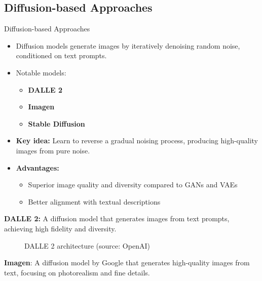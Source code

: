 \subsection{Diffusion-based Approaches}
\begin{frame}[allowframebreaks]{Diffusion-based Approaches}
    \begin{itemize}
        \item Diffusion models generate images by iteratively denoising random noise, conditioned on text prompts.
        \item Notable models:
        \begin{itemize}
            \item \textbf{DALL\textbullet E 2}
            \item \textbf{Imagen}
            \item \textbf{Stable Diffusion}
        \end{itemize}
        \item \textbf{Key idea:} Learn to reverse a gradual noising process, producing high-quality images from pure noise.
        \item \textbf{Advantages:}
        \begin{itemize}
            \item Superior image quality and diversity compared to GANs and VAEs
            \item Better alignment with textual descriptions
        \end{itemize}
    \end{itemize}
\framebreak
    \textbf{DALL\textbullet E 2:} A diffusion model that generates images from text prompts, achieving high fidelity and diversity.
    \begin{figure}
        \centering
        \caption*{DALL\textbullet E 2 architecture (source: OpenAI)}
    \end{figure}
\framebreak
    \begin{figure}
        \centering
    \end{figure}
\framebreak
    \item \textbf{Imagen}: A diffusion model by Google that generates high-quality images from text, focusing on photorealism and fine details.

\end{frame}
